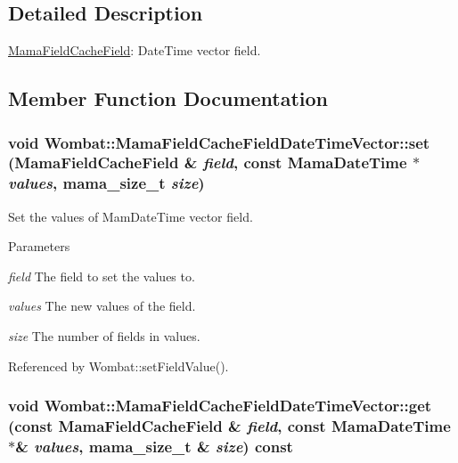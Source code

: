 \subsection{Detailed Description}
\hyperlink{classWombat_1_1MamaFieldCacheField}{MamaFieldCacheField}: DateTime vector field. 

\subsection{Member Function Documentation}
\hypertarget{classWombat_1_1MamaFieldCacheFieldDateTimeVector_a9b6abc070e46a310e9c31800037d7209}{
\subsubsection[{set}]{\setlength{\rightskip}{0pt plus 5cm}void Wombat::MamaFieldCacheFieldDateTimeVector::set ({\bf MamaFieldCacheField} \& {\em field}, \/  const {\bf MamaDateTime} $\ast$ {\em values}, \/  {\bf mama\_\-size\_\-t} {\em size})}}
\label{classWombat_1_1MamaFieldCacheFieldDateTimeVector_a9b6abc070e46a310e9c31800037d7209}


Set the values of MamDateTime vector field. 
\begin{DoxyParams}{Parameters}
\item[{\em field}]The field to set the values to. \item[{\em values}]The new values of the field. \item[{\em size}]The number of fields in {\ttfamily values}. \end{DoxyParams}


Referenced by Wombat::setFieldValue().\hypertarget{classWombat_1_1MamaFieldCacheFieldDateTimeVector_a92246a2afd91bb502c46b714e771a431}{
\subsubsection[{get}]{\setlength{\rightskip}{0pt plus 5cm}void Wombat::MamaFieldCacheFieldDateTimeVector::get (const {\bf MamaFieldCacheField} \& {\em field}, \/  const {\bf MamaDateTime} $\ast$\& {\em values}, \/  {\bf mama\_\-size\_\-t} \& {\em size}) const}}
\label{classWombat_1_1MamaFieldCacheFieldDateTimeVector_a92246a2afd91bb502c46b714e771a431}


